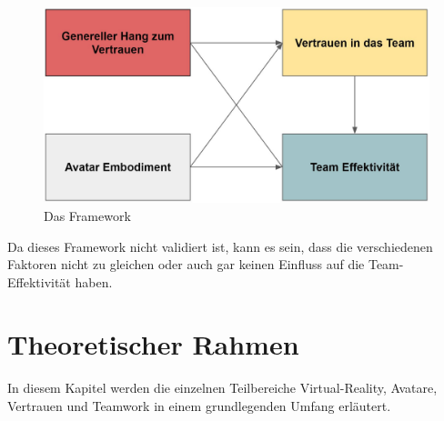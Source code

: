 \documentclass[a4paper,11pt]{article}%
\renewcommand{\\}{\vspace*{0.5\baselineskip} \newline}
\begin{document}
	\begin{figure}[H]
		\begin{footnotesize}
		\centering
			\includegraphics[scale=0.4]{Abbildungen/Framework_02.JPG}
			
			\caption[Abbildung 1]{Das Framework}
			\label{Framework}
		\end{footnotesize}
	\end{figure}

Da dieses Framework nicht validiert ist, kann es sein, dass die verschiedenen Faktoren nicht zu gleichen oder auch gar keinen Einfluss auf die Team-Effektivität haben.
%
%
%
%

	\newpage
\section{Theoretischer Rahmen}

In diesem Kapitel werden die einzelnen Teilbereiche \dq{}Virtual-Reality\dq{}, \dq{}Avatare\dq{}, \dq{}Vertrauen\dq{} und \dq{}Teamwork\dq{} in einem grundlegenden Umfang  erläutert.
\end{document}
